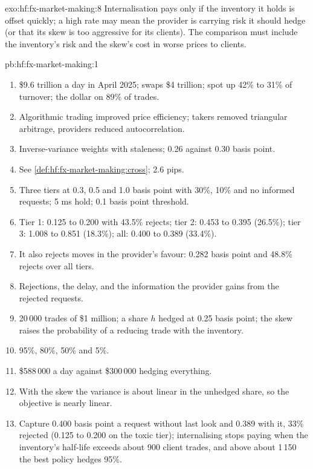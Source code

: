 \begin{solution}{exo:hf:fx-market-making:8}
Internalisation pays only if the inventory it holds is offset quickly; a high rate may mean the provider is carrying risk it should hedge (or that
its skew is too aggressive for its clients). The comparison must include the inventory's risk and the skew's cost in worse prices to clients.
\end{solution}

\begin{solution}{pb:hf:fx-market-making:1}
\begin{enumerate}
\item \$9.6 trillion a day in April 2025; swaps \$4 trillion; spot up 42\% to 31\% of turnover; the dollar on 89\% of trades.
\item Algorithmic trading improved price efficiency; takers removed triangular arbitrage, providers reduced autocorrelation.
\item Inverse-variance weights with staleness; 0.26 against 0.30 basis point.
\item See \cref{def:hf:fx-market-making:cross}; 2.6 pips.
\item Three tiers at 0.3, 0.5 and 1.0 basis point with 30\%, 10\% and no informed requests; 5 ms hold; 0.1 basis point threshold.
\item Tier 1: 0.125 to 0.200 with 43.5\% rejects; tier 2: 0.453 to 0.395 (26.5\%); tier 3: 1.008 to 0.851 (18.3\%); all: 0.400 to 0.389 (33.4\%).
\item It also rejects moves in the provider's favour: 0.282 basis point and 48.8\% rejects over all tiers.
\item Rejections, the delay, and the information the provider gains from the rejected requests.
\item 20\,000 trades of \$1 million; a share $h$ hedged at 0.25 basis point; the skew raises the probability of a reducing trade with the inventory.
\item 95\%, 80\%, 50\% and 5\%.
\item \$588\,000 a day against \$300\,000 hedging everything.
\item With the skew the variance is about linear in the unhedged share, so the objective is nearly linear.
\item Capture 0.400 basis point a request without last look and 0.389 with it, 33\% rejected (0.125 to 0.200 on the toxic tier); internalising stops
paying when the inventory's half-life exceeds about 900 client trades, and above about 1\,150 the best policy hedges 95\%.

\end{enumerate}
\end{solution}
